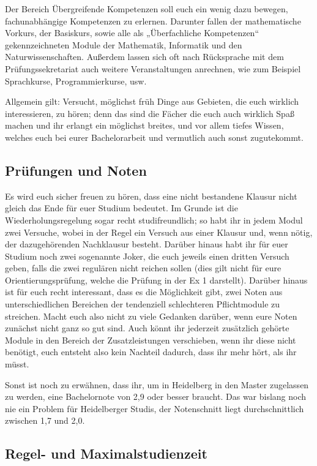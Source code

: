 Der Bereich Übergreifende Kompetenzen soll euch ein wenig dazu bewegen, fachunabhängige Kompetenzen zu erlernen. Darunter fallen der mathematische Vorkurs, der Basiskurs, sowie alle als „Überfachliche Kompetenzen“ gekennzeichneten Module der Mathematik, Informatik und den Naturwissenschaften. Außerdem lassen sich oft nach Rücksprache mit dem Prüfungssekretariat auch weitere Veranstaltungen anrechnen, wie zum Beispiel Sprachkurse, Programmierkurse, usw.

Allgemein gilt: Versucht, möglichst früh Dinge aus Gebieten, die euch wirklich interessieren, zu hören; denn das sind die Fächer die euch auch wirklich Spaß machen und ihr erlangt ein möglichst breites, und vor allem tiefes Wissen, welches euch bei eurer Bachelorarbeit und vermutlich auch sonst zugutekommt.

\subsection{Prüfungen und Noten}

Es wird euch sicher freuen zu hören, dass eine nicht bestandene Klausur nicht gleich das Ende für euer Studium bedeutet. Im Grunde ist die Wiederholungsregelung sogar recht studifreundlich; so habt ihr in jedem Modul zwei Versuche, wobei in der Regel ein Versuch aus einer Klausur und, wenn nötig, der dazugehörenden Nachklausur besteht. Darüber hinaus habt ihr für euer Studium noch zwei sogenannte Joker, die euch jeweils einen dritten Versuch geben, falls die zwei regulären nicht reichen sollen (dies gilt nicht für eure Orientierungsprüfung, welche die Prüfung in der \gls{Ex} 1 darstellt). Darüber hinaus ist für euch recht interessant, dass es die Möglichkeit gibt, zwei Noten aus unterschiedlichen Bereichen der tendenziell schlechteren Pflichtmodule zu streichen. Macht euch also nicht zu viele Gedanken darüber, wenn eure Noten zunächst nicht ganz so gut sind. Auch könnt ihr jederzeit zusätzlich gehörte Module in den Bereich der Zusatzleistungen verschieben, wenn ihr diese nicht benötigt, euch entsteht also kein Nachteil dadurch, dass ihr mehr hört, als ihr müsst.

Sonst ist noch zu erwähnen, dass ihr, um in Heidelberg in den Master zugelassen zu werden, eine Bachelornote von 2,9 oder besser braucht. Das war bislang noch nie ein Problem für Heidelberger Studis, der Notenschnitt liegt durchschnittlich zwischen 1,7 und 2,0.

\subsection{Regel- und Maximalstudienzeit}

